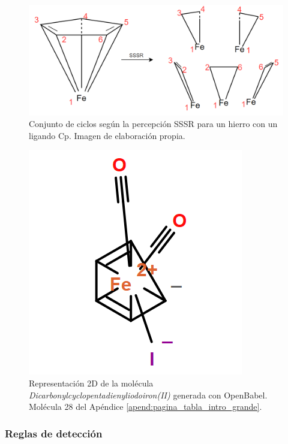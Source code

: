 \begin{figure}[h!]
    \centering
    \includegraphics[scale=0.35]{imagenes/diseno/dibujo/sssr_iron.png}
    \caption{Conjunto de ciclos según la percepción SSSR para un hierro con un ligando Cp. Imagen de elaboración propia.}
    \label{fig:sssr_iron(II)}
\end{figure}


\begin{figure}[h!]
    \centering
    \includegraphics[scale=0.5]{imagenes/diseno/dibujo/iron(II)_Original.png}
    \caption{Representación 2D de la molécula \textit{Dicarbonylcyclopentadienyliodoiron(II)} generada con OpenBabel. Molécula 28 del Apéndice \ref{apend:pagina_tabla_intro_grande}.}
    \label{fig:iron(II)Original}
\end{figure}

\subsubsection{Reglas de detección} \label{reglas_deteccion_cp}

